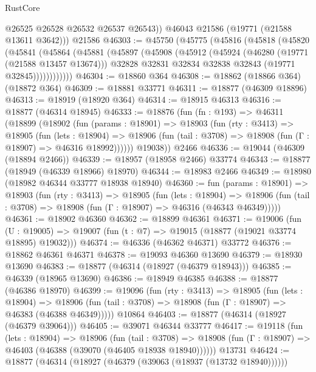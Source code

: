 \begin{lexlean}{RustCore}
\begin{coremodule}
          @26525
          @26528
          @26532
          @26537
          @26543))
      @46043
      @21586
      (@19771 (@21588 @13611 @3642)))
    @21586
@46303 := @45750
    (@45775
      (@45816
        (@45818
          (@45820
            (@45841
              (@45864
                (@45881
                  (@45897
                    (@45908
                      (@45912
                        (@45924
                          (@46280 (@19771 (@21588 @13457 @13674)))
                          @32828
                          @32831
                          @32834
                          @32838
                          @32843
                          (@19771 @32845))))))))))))
@46304 := @18860 @364
@46308 := @18862 (@18866 @364) (@18872 @364)
@46309 := @18881 @33771
@46311 := @18877 (@46309 @18896)
@46313 := @18919 (@18920 @364)
@46314 := @18915 @46313
@46316 := @18877 (@46314 @18945)
@46333 := @18876
    (fun (fn : @193) =>
    @46311
      (@18899
        (@18902
          (fun (params : @18901) =>
          @18903
            (fun (rty : @3413) =>
            @18905
              (fun (lets : @18904) =>
              @18906 (fun (tail : @3708) => @18908 (fun (Γ : @18907) => @46316 @18992))))))
        @19038))
    @2466
@46336 := @19044 (@46309 (@18894 @2466))
@46339 := @18957 (@18958 @2466) @33774
@46343 := @18877 (@18949 (@46339 @18966) @18970)
@46344 := @18983 @2466
@46349 := @18980 (@18982 @46344 @33777 @18938 @18940)
@46360 := fun (params : @18901) =>
  @18903
    (fun (rty : @3413) =>
    @18905
      (fun (lets : @18904) =>
      @18906 (fun (tail : @3708) => @18908 (fun (Γ : @18907) => @46316 (@46343 @46349)))))
@46361 := @18902 @46360
@46362 := @18899 @46361
@46371 := @19006
    (fun (U : @19005) => @19007 (fun (t : @7) => @19015 (@18877 (@19021 @33774 @18895) @19032)))
@46374 := @46336 (@46362 @46371) @33772
@46376 := @18862 @46361 @46371
@46378 := @19093 @46360 @13690
@46379 := @18930 @13690
@46383 := @18877 (@46314 (@18927 (@46379 @18943)))
@46385 := @46339 (@18965 @13690)
@46386 := @18949 @46385
@46388 := @18877 (@46386 @18970)
@46399 := @19096
    (fun (rty : @3413) =>
    @18905
      (fun (lets : @18904) =>
      @18906 (fun (tail : @3708) => @18908 (fun (Γ : @18907) => @46383 (@46388 @46349)))))
    @10864
@46403 := @18877 (@46314 (@18927 (@46379 @39064)))
@46405 := @39071 @46344 @33777
@46417 := @19118
    (fun (lets : @18904) =>
    @18906
      (fun (tail : @3708) =>
      @18908 (fun (Γ : @18907) => @46403 (@46388 (@39070 (@46405 @18938 @18940))))))
    @13731
@46424 := @18877 (@46314 (@18927 (@46379 (@39063 (@18937 (@13732 @18940))))))

\end{coremodule}
\end{lexlean}
